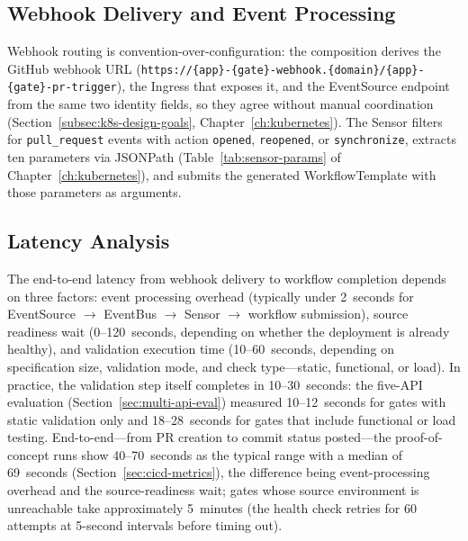 \subsection{Webhook Delivery and Event Processing}
\label{subsec:webhook-delivery}
\label{subsec:event-processing}

Webhook routing is convention-over-configuration: the composition derives the GitHub webhook URL (\texttt{https://\{app\}-\{gate\}-webhook.\allowbreak\{domain\}/\allowbreak\{app\}-\{gate\}-\allowbreak pr-trigger}), the Ingress that exposes it, and the EventSource endpoint from the same two identity fields, so they agree without manual coordination (Section~\ref{subsec:k8s-design-goals}, Chapter~\ref{ch:kubernetes}). The Sensor filters for \texttt{pull\_request} events with action \texttt{opened}, \texttt{reopened}, or \texttt{synchronize}, extracts ten parameters via JSONPath (Table~\ref{tab:sensor-params} of Chapter~\ref{ch:kubernetes}), and submits the generated WorkflowTemplate with those parameters as arguments.

\subsection{Latency Analysis}
\label{subsec:latency}

The end-to-end latency from webhook delivery to workflow completion depends on three factors: event processing overhead (typically under 2~seconds for EventSource $\rightarrow$ EventBus $\rightarrow$ Sensor $\rightarrow$ workflow submission), source readiness wait (0--120~seconds, depending on whether the deployment is already healthy), and validation execution time (10--60~seconds, depending on specification size, validation mode, and check type---static, functional, or load). In practice, the validation step itself completes in 10--30~seconds: the five-API evaluation (Section~\ref{sec:multi-api-eval}) measured 10--12~seconds for gates with static validation only and 18--28~seconds for gates that include functional or load testing. End-to-end---from PR creation to commit status posted---the proof-of-concept runs show 40--70~seconds as the typical range with a median of 69~seconds (Section~\ref{sec:cicd-metrics}), the difference being event-processing overhead and the source-readiness wait; gates whose source environment is unreachable take approximately 5~minutes (the health check retries for 60 attempts at 5-second intervals before timing out).

